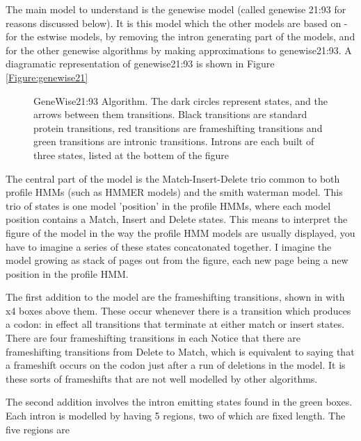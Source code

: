 \documentclass{article}
\begin{document}
The main model to understand is the genewise model (called genewise 21:93
for reasons discussed below). It is this model which the other models
are based on - for the estwise models, by removing the intron generating
part of the models, and for the other genewise algorithms by making 
approximations to genewise21:93. A diagramatic representation of genewise21:93
is shown in Figure \ref{Figure:genewise21}

\begin{figure}
\begin{center}
\leavevmode  
\epsfxsize 300pt
\newline     
\caption{GeneWise21:93 Algorithm. The dark circles represent states, and the
arrows between them transitions. Black transitions are standard
protein transitions, red transitions are frameshifting transitions and
green transitions are intronic transitions. Introns are each built of
three states, listed at the bottem of the figure}
\label{Figure:genewise2193}
\end{center} 
\end{figure} 


The central part of the model is the Match-Insert-Delete trio common to both
profile HMMs (such as HMMER models) and the smith waterman model. This trio
of states is one model 'position' in the profile HMMs, where each model position
contains a Match, Insert and Delete states. This means to interpret the figure
of the model in the way the profile HMM models are usually displayed, you have
to imagine a series of these states concatonated together. I imagine the model
growing as stack of pages out from the figure, each new page being a new position
in the profile HMM. 

The first addition to the model are the frameshifting transitions, shown in
with x4 boxes above them. These occur whenever there is a transition which
produces a codon: in effect all transitions that terminate at either match
or insert states. There are four frameshifting transitions in each 
Notice that there are frameshifting transitions from Delete
to Match, which is equivalent to saying that a frameshift occurs on the codon
just after a run of deletions in the model. It is these sorts of frameshifts 
that are not well modelled by other algorithms.

The second addition involves the intron emitting states found in the green boxes.
Each intron is modelled by having 5 regions, two of which are fixed length. The 
five regions are
\end{document}
